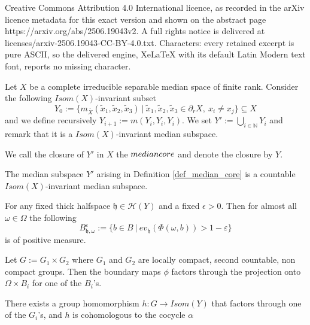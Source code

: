 \documentclass[10pt,a4paper]{amsart}
\def\bar{\overline}
\newcommand{\HH}{\mathcal{H}}     %
\newcommand{\NN}{\mathbb{N}}      %
\newcommand{\hh}{\mathfrak{h}}    %
\begin{document}
Creative Commons Attribution 4.0 International licence, as recorded in the arXiv licence metadata for this exact version and shown on the abstract page https://arxiv.org/abs/2506.19043v2. A full rights notice is delivered at licenses/arxiv-2506.19043-CC-BY-4.0.txt. Characters: every retained excerpt is pure ASCII, so the delivered engine, XeLaTeX with its default Latin Modern text font, reports no missing character.
\begin{defi}\label{def_median_core}
    Let $X$ be a complete irreducible separable median space of finite rank. 
    Consider the following $Isom(X)$-invariant subset
  \[
    Y_0:=\{m_{\bar X}(\tilde{x}_1,\tilde{x}_2,\tilde{x}_3) \ |\ \tilde{x}_1,\tilde{x}_2,\tilde{x}_3\in  \partial_r X, \ x_i\neq x_j\}\subseteq X 
  \]
    and we define recursively $Y_{i+1}:= m(Y_i,Y_i,Y_i)$. We set $Y':=\displaystyle{\bigcup_{i\in\NN}Y_i}$ and remark that it is a $Isom(X)$-invariant median subspace.\par
   We call the closure of $Y'$ in $X$ the $\textbf{\textit{median core}}$ and denote the closure by $Y$.%
\end{defi}

\begin{thm}\label{thm_countable_medians_subspace}
    The median subspace $Y'$ arising in Definition \ref{def_median_core} is a countable $Isom(X)$-invariant median subspace.
\end{thm}

\begin{lem}\label{lem_Fubini2}
    For any fixed thick halfspace $\hh\in \HH(Y)$ and a fixed $\epsilon>0$. Then for almost all $\omega \in\Omega$ the following 
    \[
    B_{\hh,\omega}^\varepsilon:=\{b\in B\ | \ ev_\hh(\Phi(\omega,b))>1-\varepsilon\}
    \]
    is of positive measure.
\end{lem}

\begin{prop}\label{prop_boundary_map_factors}
    Let $G:=G_1\times G_2$ where $G_1$ and $G_2$ are locally compact, second countable, non compact groups. Then the boundary maps $\phi$ factors through the projection onto $\Omega\times B_i$ for one of the $B_i$'s.
\end{prop}

\begin{thm}\label{theoerem_superrigidity_cocycle}
    There exists a group homomorphism $h:G\rightarrow Isom(Y)$ that factors through one of the $G_i$'s, and $h$ is cohomologous to the cocycle $\alpha$
\end{thm}
\end{document}

